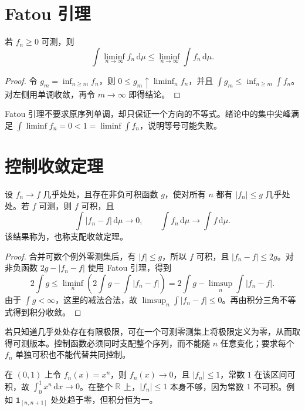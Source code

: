 \documentclass[UTF8,12pt,a4paper,fontset=fandol]{ctexbook}
\begin{document}
\section{Fatou 引理}
\begin{theorem}[Fatou 引理]
若 $f_n\geq0$ 可测，则
\begin{equation}
 \int\liminf_{n\to\infty}f_n\,\mathrm d\mu
 \leq\liminf_{n\to\infty}\int f_n\,\mathrm d\mu.
 \label{eq:mt-fatou}
\end{equation}
\label{thm:mt-fatou}
\end{theorem}
\begin{proof}
令 $g_m=\inf_{n\geq m}f_n$，则 $0\leq g_m\uparrow\liminf_nf_n$，并且 $\int g_m\leq\inf_{n\geq m}\int f_n$。对左侧用单调收敛，再令 $m\to\infty$ 即得结论。
\end{proof}
Fatou 引理不要求原序列单调，却只保证一个方向的不等式。绪论中的集中尖峰满足 $\int\liminf f_n=0<1=\liminf\int f_n$，说明等号可能失败。

\section{控制收敛定理}
\begin{theorem}[控制收敛定理]
设 $f_n\to f$ 几乎处处，且存在非负可积函数 $g$，使对所有 $n$ 都有 $|f_n|\leq g$ 几乎处处。若 $f$ 可测，则 $f$ 可积，且
\begin{equation}
 \int|f_n-f|\,\mathrm d\mu\longrightarrow0,\qquad
 \int f_n\,\mathrm d\mu\longrightarrow\int f\,\mathrm d\mu.
 \label{eq:mt-dct}
\end{equation}
该结果称为，也称支配收敛定理。
\label{thm:mt-dct}
\end{theorem}
\begin{proof}
合并可数个例外零测集后，有 $|f|\leq g$，所以 $f$ 可积，且 $|f_n-f|\leq2g$。对非负函数 $2g-|f_n-f|$ 使用 Fatou 引理，得到
\[
 2\int g\leq
 \liminf_n\left(2\int g-\int|f_n-f|\right)
 =2\int g-\limsup_n\int|f_n-f|.
\]
由于 $\int g<\infty$，这里的减法合法，故 $\limsup_n\int|f_n-f|\leq0$。再由积分三角不等式得到积分收敛。
\end{proof}

若只知道几乎处处存在有限极限，可在一个可测零测集上将极限定义为零，从而取得可测版本。控制函数必须同时支配整个序列，而不能随 $n$ 任意变化；要求每个 $f_n$ 单独可积也不能代替共同控制。

\begin{example}
在 $(0,1)$ 上令 $f_n(x)=x^n$，则 $f_n(x)\to0$，且 $|f_n|\leq1$，常数 $1$ 在该区间可积，故 $\int_0^1x^n\,\mathrm dx\to0$。在整个 $\mathbb R$ 上，$|f_n|\leq1$ 本身不够，因为常数 $1$ 不可积。例如 $\mathbf1_{[n,n+1]}$ 处处趋于零，但积分恒为一。
\end{example}
\end{document}
